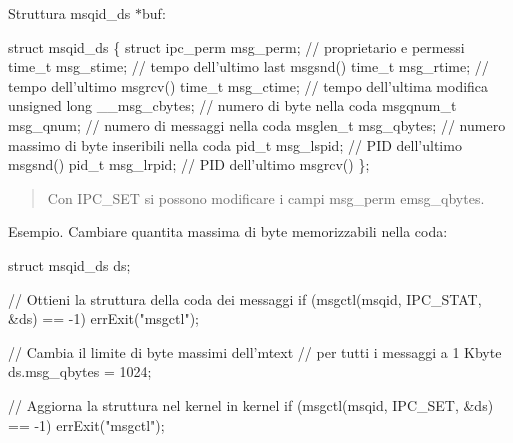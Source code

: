 Struttura msqid\+\_\+ds $\ast$buf\+: 
\begin{DoxyCode}
\textcolor{keyword}{struct }msqid\_ds \{
    \textcolor{keyword}{struct }ipc\_perm msg\_perm; \textcolor{comment}{// proprietario e permessi}
    time\_t msg\_stime; \textcolor{comment}{// tempo dell'ultimo last msgsnd()}
    time\_t msg\_rtime; \textcolor{comment}{// tempo dell'ultimo msgrcv()}
    time\_t msg\_ctime; \textcolor{comment}{// tempo dell'ultima modifica}
    \textcolor{keywordtype}{unsigned} \textcolor{keywordtype}{long} \_\_msg\_cbytes; \textcolor{comment}{// numero di byte nella coda}
    msgqnum\_t msg\_qnum; \textcolor{comment}{// numero di messaggi nella coda}
    msglen\_t msg\_qbytes; \textcolor{comment}{// numero massimo di byte inseribili nella coda}
    pid\_t msg\_lspid; \textcolor{comment}{// PID dell'ultimo msgsnd()}
    pid\_t msg\_lrpid; \textcolor{comment}{// PID dell'ultimo msgrcv()}
\};
\end{DoxyCode}
 \begin{quote}
Con {\ttfamily I\+P\+C\+\_\+\+S\+ET} si possono modificare i campi {\ttfamily msg\+\_\+perm} e{\ttfamily msg\+\_\+qbytes}. \end{quote}


Esempio. Cambiare quantita\textquotesingle{} massima di byte memorizzabili nella coda\+: 
\begin{DoxyCode}
\textcolor{keyword}{struct }msqid\_ds ds;

\textcolor{comment}{// Ottieni la struttura della coda dei messaggi}
\textcolor{keywordflow}{if} (msgctl(msqid, IPC\_STAT, &ds) == -1)
    errExit(\textcolor{stringliteral}{"msgctl"});

\textcolor{comment}{// Cambia il limite di byte massimi dell'mtext}
\textcolor{comment}{// per tutti i messaggi a 1 Kbyte}
ds.msg\_qbytes = 1024;

\textcolor{comment}{// Aggiorna la struttura nel kernel in kernel}
\textcolor{keywordflow}{if} (msgctl(msqid, IPC\_SET, &ds) == -1)
    errExit(\textcolor{stringliteral}{"msgctl"});
\end{DoxyCode}
 